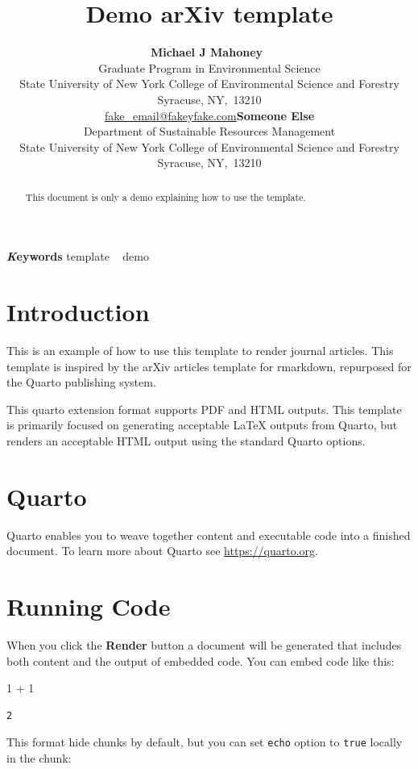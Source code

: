 \documentclass[
]{article}
\title{Demo arXiv template}
\author{\textbf{Michael J
Mahoney}~\orcidlink{0000-0003-2402-304X}\\Graduate Program in
Environmental Science\\State University of New York College of
Environmental Science and Forestry\\Syracuse,
NY,\ 13210\\\href{mailto:fake\_email@fakeyfake.com}{fake\_email@fakeyfake.com}\asep\textbf{Someone
Else}\\Department of Sustainable Resources Management\\State University
of New York College of Environmental Science and Forestry\\Syracuse,
NY,\ 13210\\}
\date{}
\newenvironment{Shaded}{\begin{snugshade}}{\end{snugshade}}
\newcommand{\DecValTok}[1]{\textcolor[rgb]{0.68,0.00,0.00}{#1}}
\newcommand{\OperatorTok}[1]{\textcolor[rgb]{0.37,0.37,0.37}{#1}}
\begin{document}
\maketitle
\begin{abstract}
This document is only a demo explaining how to use the template.
\end{abstract}
{\bfseries \emph Keywords}
\def\sep{\textbullet\ }
template \sep 
demo



\section{Introduction}\label{sec-intro}

This is an example of how to use this template to render journal
articles. This template is inspired by the arXiv articles template for
rmarkdown, repurposed for the Quarto publishing system.

This quarto extension format supports PDF and HTML outputs. This
template is primarily focused on generating acceptable {\LaTeX} outputs
from Quarto, but renders an acceptable HTML output using the standard
Quarto options.

\section{Quarto}\label{quarto}

Quarto enables you to weave together content and executable code into a
finished document. To learn more about Quarto see
\url{https://quarto.org}.

\section{Running Code}\label{running-code}

When you click the \textbf{Render} button a document will be generated
that includes both content and the output of embedded code. You can
embed code like this:

\begin{Shaded}
\begin{Highlighting}[]
\DecValTok{1} \OperatorTok{+} \DecValTok{1}
\end{Highlighting}
\end{Shaded}

\begin{verbatim}
2
\end{verbatim}

This format hide chunks by default, but you can set \texttt{echo} option
to \texttt{true} locally in the chunk:
\end{document}
